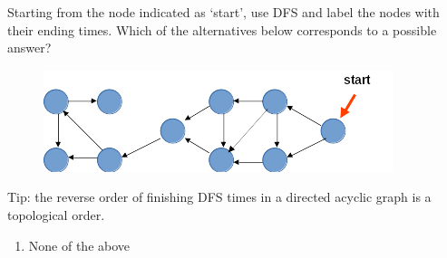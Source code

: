 
Starting from the node indicated as `start', use DFS and label the nodes with their ending times. Which of the alternatives below corresponds to a possible answer?

\begin{figure}[H]
    \centering
    \includegraphics{images/119-0.png}
\end{figure}

Tip: the reverse order of finishing DFS times in a directed acyclic graph is a topological order.

\begin{enumerate}[label={\Alph*.}]

\raggedcolumns{}

\raggedcolumns{}

    \item None of the above
\end{enumerate}

